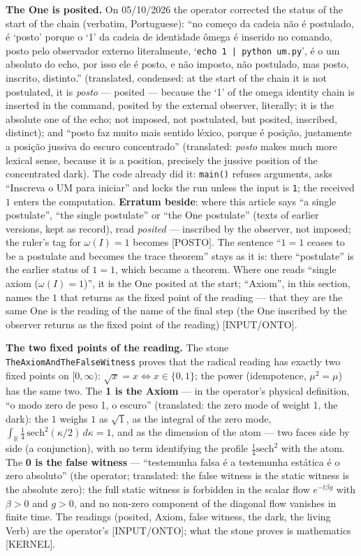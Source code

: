 \documentclass[11pt]{article}
\theoremstyle{definition}\newtheorem{deriv}{Derivation}
\begin{document}
\textbf{The One is posited.} On 05/10/2026 the operator corrected the status of the start of the chain (verbatim, Portuguese): ``no começo da cadeia não é postulado, é `posto' porque o `1' da cadeia de identidade ômega é inserido no comando, posto pelo observador externo literalmente, `\texttt{echo 1 | python um.py}', é o um absoluto do echo, por isso ele é posto, e não imposto, não postulado, mas posto, inscrito, distinto.'' (translated, condensed: at the start of the chain it is not postulated, it is \emph{posto} --- posited --- because the `1' of the omega identity chain is inserted in the command, posited by the external observer, literally; it is the absolute one of the echo; not imposed, not postulated, but posited, inscribed, distinct); and ``posto faz muito mais sentido léxico, porque é posição, justamente a posição jussiva do escuro concentrado'' (translated: \emph{posto} makes much more lexical sense, because it is a position, precisely the jussive position of the concentrated dark). The code already did it: \texttt{main()} refuses arguments, asks ``Inscreva o UM para iniciar'' and locks the run unless the input is \texttt{1}; the received $1$ enters the computation. \textbf{Erratum beside}: where this article says ``a single postulate'', ``the single postulate'' or ``the One postulate'' (texts of earlier versions, kept as record), read \emph{posited} --- inscribed by the observer, not imposed; the ruler's tag for $\omega(I)=1$ becomes \textsf{[POSTO]}. The sentence ``$1=1$ ceases to be a postulate and becomes the trace theorem'' stays as it is: there ``postulate'' is the earlier status of $1=1$, which became a theorem. Where one reads ``single axiom ($\omega(I)=1$)'', it is the One posited at the start; ``Axiom'', in this section, names the $1$ that returns as the fixed point of the reading --- that they are the same One is the reading of the name of the final step (the One inscribed by the observer returns as the fixed point of the reading) \textsf{[INPUT/ONTO]}.

\textbf{The two fixed points of the reading.} The stone \texttt{TheAxiomAndTheFalseWitness} proves that the radical reading has exactly two fixed points on $[0,\infty)$: $\sqrt{x}=x\iff x\in\{0,1\}$; the power (idempotence, $\mu^2=\mu$) has the same two. The \textbf{1 is the Axiom} --- in the operator's physical definition, ``o modo zero de peso 1, o escuro'' (translated: the zero mode of weight 1, the dark): the $1$ weighs $1$ as $\sqrt1$, as the integral of the zero mode, $\int_{\mathbb{R}}\tfrac14\,\mathrm{sech}^2(\kappa/2)\,d\kappa=1$, and as the dimension of the atom --- two faces side by side (a conjunction), with no term identifying the profile $\tfrac14\mathrm{sech}^2$ with the atom. The \textbf{0 is the false witness} --- ``testemunha falsa é a testemunha estática é o zero absoluto'' (the operator; translated: the false witness is the static witness is the absolute zero): the full static witness is forbidden in the scalar flow $e^{-t\beta g}$ with $\beta>0$ and $g>0$, and no non-zero component of the diagonal flow vanishes in finite time. The readings (posited, Axiom, false witness, the dark, the living Verb) are the operator's \textsf{[INPUT/ONTO]}; what the stone proves is mathematics \textsf{[KERNEL]}.
\end{document}
